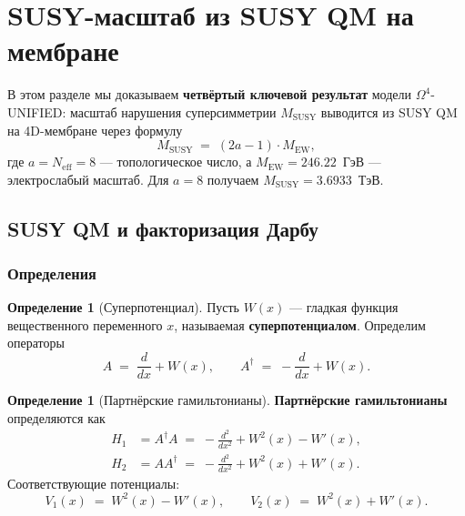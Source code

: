 \documentclass[11pt,a4paper]{article}
\newcommand{\Om}{\ensuremath{\Omega^4}}
\theoremstyle{definition}
\newtheorem{definition}[theorem]{Определение}
\begin{document}
\section{SUSY-масштаб из SUSY QM на мембране}
\label{sec:susy}

В этом разделе мы доказываем \textbf{четвёртый ключевой результат}
модели $\Om$-UNIFIED: масштаб нарушения суперсимметрии
$M_{\text{SUSY}}$ выводится из SUSY QM на 4D-мембране через
формулу
\begin{equation}
    M_{\text{SUSY}} \;=\; (2a - 1) \cdot M_{\text{EW}},
    \label{eq:MSUSY-preview}
\end{equation}
где $a = N_{\text{eff}} = 8$ --- топологическое число,
а $M_{\text{EW}} = 246.22$~ГэВ --- электрослабый масштаб.
Для $a = 8$ получаем $M_{\text{SUSY}} = 3.6933$~ТэВ.

\subsection{SUSY QM и факторизация Дарбу}
\label{subsec:susy-qm}

\subsubsection{Определения}

\begin{definition}[Суперпотенциал]
\label{def:superpotential}
Пусть $W(x)$ --- гладкая функция вещественного переменного $x$,
называемая \textbf{суперпотенциалом}. Определим операторы
\begin{equation}
    A \;=\; \frac{d}{dx} + W(x), \qquad
    A^\dagger \;=\; -\frac{d}{dx} + W(x).
    \label{eq:operators-A}
\end{equation}
\end{definition}

\begin{definition}[Партнёрские гамильтонианы]
\label{def:partner-hamiltonians}
\textbf{Партнёрские гамильтонианы} определяются как
\begin{align}
    H_1 &= A^\dagger A
    \;=\; -\frac{d^2}{dx^2} + W^2(x) - W'(x), \label{eq:H1} \\[0.3em]
    H_2 &= A A^\dagger
    \;=\; -\frac{d^2}{dx^2} + W^2(x) + W'(x). \label{eq:H2}
\end{align}
Соответствующие потенциалы:
\begin{equation}
    V_1(x) \;=\; W^2(x) - W'(x), \qquad
    V_2(x) \;=\; W^2(x) + W'(x).
    \label{eq:partner-potentials}
\end{equation}
\end{definition}
\end{document}
